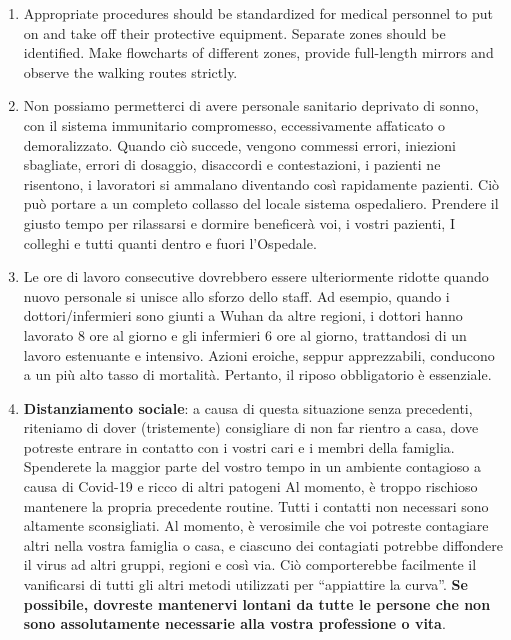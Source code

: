 \documentclass[onecolumn,journal]{IEEEtran}
\begin{document}
\begin{multicols}{2}
\begin{enumerate}
\item Appropriate procedures should be standardized for medical personnel to put on and take off their protective equipment. Separate zones should be identified. Make flowcharts of different zones, provide full-length mirrors and observe the walking routes strictly.  %

\item Non possiamo permetterci di avere personale sanitario deprivato di sonno, con il sistema immunitario compromesso, eccessivamente affaticato o demoralizzato. Quando ciò succede, vengono commessi errori, iniezioni sbagliate, errori di dosaggio, disaccordi e contestazioni, i pazienti ne risentono, i lavoratori si ammalano diventando così rapidamente pazienti. Ciò può portare a un completo collasso del locale sistema ospedaliero. Prendere il giusto tempo per rilassarsi e dormire beneficerà voi, i vostri pazienti, I colleghi e tutti quanti dentro e fuori l’Ospedale.

\item Le ore di lavoro consecutive dovrebbero essere ulteriormente ridotte quando nuovo personale si unisce allo sforzo dello staff. Ad esempio, quando i dottori/infermieri sono giunti a Wuhan da altre regioni, i dottori hanno lavorato 8 ore al giorno e gli infermieri 6 ore al giorno, trattandosi di un lavoro estenuante e intensivo. Azioni eroiche, seppur apprezzabili, conducono a un più alto tasso di mortalità. Pertanto, il riposo obbligatorio è essenziale.

\item \textbf{Distanziamento sociale}: a causa di questa situazione senza precedenti, riteniamo di dover (tristemente) consigliare di non far rientro a casa, dove potreste entrare in contatto con i vostri cari e i membri della famiglia. Spenderete la maggior parte del vostro tempo in un ambiente contagioso a causa di Covid-19 e ricco di altri patogeni Al momento, è troppo rischioso mantenere la propria precedente routine. Tutti i contatti non necessari sono altamente sconsigliati. Al momento, è verosimile che voi potreste contagiare altri nella vostra famiglia o casa, e ciascuno dei contagiati potrebbe diffondere il virus ad altri gruppi, regioni e così via. Ciò comporterebbe facilmente il vanificarsi di tutti gli altri metodi utilizzati per “appiattire la curva”. \textbf{Se possibile, dovreste mantenervi lontani da tutte le persone che non sono assolutamente necessarie alla vostra professione o vita}.


\end{enumerate}
\end{multicols}
\end{document}
